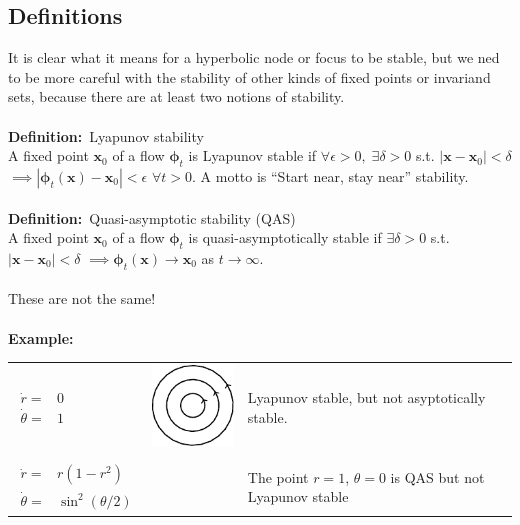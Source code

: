 \documentclass{article}
\newcommand{\example}{\textbf{Example:}}                    %
\newcommand{\definition}{\textbf{Definition:}}              %
\newcommand{\bp}{\bm{\phi}}                                 %
\begin{document}
\subsection{Definitions}
It is clear what it means for a hyperbolic node or focus to be stable, but we
ned to be more careful with the stability of other kinds of fixed points or 
invariand sets, because there are at least two notions of stability.
\\
\\
\definition\ Lyapunov stability
\\
A fixed point $\bm{x}_0$ of a flow $\bp_t$ is Lyapunov stable if
$\forall \epsilon > 0, \; \exists \delta > 0$ s.t. $|\bm{x}-\bm{x}_0| < \delta$
$\implies |\bp_t(\bm{x}) - \bm{x}_0| < \epsilon$ $\forall t>0$.
A motto is ``Start near, stay near'' stability.
\\
\\
\definition\ Quasi-asymptotic stability (QAS)
\\
A fixed point $\bm{x}_0$ of a flow $\bp_t$ is quasi-asymptotically 
stable if $\exists \delta > 0$ s.t. $|\bm{x}-\bm{x}_0| < \delta$ $\implies
\bp_t(\bm{x}) \to \bm{x}_0$ as $t \to \infty$.
\\
\\
These are not the same!
\\
\\
\example\
\\
\begin{tabular}{m{3cm} m{4cm} m{9cm}  } 
$\begin{array}{lr} 
\dot{r} = & 0 \\
\dot{\theta} = & 1
\end{array}$ &
\includegraphics{Fig12.pdf}  & 
Lyapunov stable, but not asyptotically stable.
\\
\\
$\begin{array}{lr} 
\dot{r} = & r(1-r^2) \\
\dot{\theta} = & \sin^2(\theta/2)
\end{array}$ &
&%
The point $r=1$, $\theta = 0$ is QAS but not Lyapunov stable
\end{tabular}
\\
\end{document}
